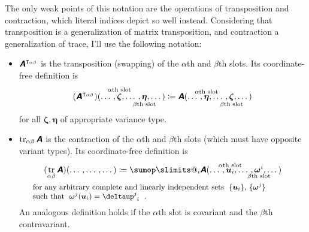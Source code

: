 \documentclass[\ifafour a4paper,12pt,\else a5paper,10pt,\fi%
onecolumn,oneside,article,%
british%
]{memoir}
\makeatletter
\theoremstyle{remark}
\theoremstyle{innote}
\def\sum{\DOTSI\sumop\slimits@}
\newcommand*{\mathte}[1]{\textbf{\textit{\textsf{#1}}}}
\newcommand*{\delt}{\deltaup}%
\DeclareMathOperator{\tr}{tr}%
\newcommand*{\defd}{\coloneqq}
\DeclarePairedDelimiter\set{\{}{\}}
\renewcommand*{\|}[1][]{\nonscript\,#1\vert\nonscript\;\mathopen{}}
\newcommand*{\tsum}{\mathop{\textstyle\sum}\nolimits}
\newcommand*{\yA}{\mathte{A}}
\renewcommand*{\i}{\indices}
\newcommand*{\id}{\mathbf{id}}%
\makeatother
\begin{document}
The only weak points of this notation are the operations of transposition
and contraction, which literal indices depict so well instead. Considering
that transposition is a generalization of matrix transposition, and
contraction a generalization of trace, I'll use the following notation:
\begin{itemize}[wide]%
\item $\yA^{\intercal_{\alpha\beta}}$ is the transposition
  (swapping) of the $\alpha$th and $\beta$th slots. Its coordinate-free
  definition is
  \begin{equation}
    \label{eq:def_transp}
    (\yA^{\intercal_{\alpha\beta}})(\dotso,
    \overset{\mathclap{\scriptstyle\text{$\alpha$th slot}}}{\bm{\zeta}}
    ,\dotso,
    \underset{\mathclap{\scriptstyle\text{$\beta$th slot}}}{\bm{\eta}}
    ,\dotso)
    \defd
    \yA(\dotso,
    \overset{\mathclap{\scriptstyle\text{$\alpha$th slot}}}{\bm{\eta}}
    ,\dotso,
    \underset{\mathclap{\scriptstyle\text{$\beta$th slot}}}{\bm{\zeta}}
    ,\dotso)
  \end{equation}
  for all $\bm{\zeta},\bm{\eta}$ of appropriate variance type.
\item $\tr_{\alpha\beta}\yA$ is the contraction of the $\alpha$th and
  $\beta$th slots (which must have opposite variant types). Its
  coordinate-free definition is
  \begin{equation}
    \label{eq:def_contr}
    \begin{gathered}
      (\tr_{\alpha\beta}\yA)(\dotso
        ,\dotso
        ,\dotso)
        \defd
        \sum_{i} \yA(\dotso,
        \overset{\mathclap{\scriptstyle\text{$\alpha$th slot}}}{\bm{u}_{i}}
        ,\dotso,
        \underset{\mathclap{\scriptstyle\text{$\beta$th slot}}}{\bm{\omega}^{i}}
        ,\dotso)
      \\
      \parbox{0.9\columnwidth}{\small for any arbitrary complete and
        linearly independent sets \;$\set{\bm{u}_{i}}$,
        $\set{\bm{\omega}^{j}}$\\
        such that \;$\bm{\omega}^{j}(\bm{u}_{i}) = \delt\i{^{j}_{i}}$ \;.}
    \end{gathered}
  \end{equation}
  An analogous definition holds if the $\alpha$th slot is covariant and the
  $\beta$th contravariant.
\end{itemize}
\end{document}
